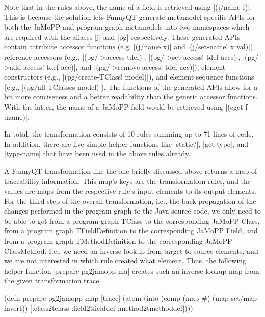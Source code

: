 \documentclass[submission]{eptcs}
\newcommand{\code}{\clojureinline}
\begin{document}
Note that in the rules above, the name of a field is retrieved using
\code|(j/name f)|.  This is because the solution lets FunnyQT generate
metamodel-specific APIs for both the JaMoPP and program graph metamodels into
two namespaces which are required with the aliases \code|j| and \code|pg|
respectively.  These generated APIs contain attribute accessor functions
(e.g. \code|(j/name x)| and \code|(j/set-name! x val)|), reference accessors
(e.g., \code|(pg/->access tdef)|, \code|(pg/->set-access! tdef accs)|,
\code|(pg/->add-access! tdef acc)|, and \code|(pg/->remove-access! tdef acc)|),
element constructors (e.g., \code|(pg/create-TClass! model)|), and element
sequence functions (e.g., \code|(pg/all-TClasses model)|).  The functions of
the generated APIs allow for a bit more conciseness and a better readability
than the generic accessor functions.  With the latter, the name of a JaMoPP
field would be retrieved using \code|(eget f :name)|.

In total, the transformation consists of 10 rules summing up to 71 lines of
code.  In addition, there are five simple helper functions like \code|static?|,
\code|get-type|, and \code|type-name| that have been used in the above rules
already.

\bigskip{}

A FunnyQT transformation like the one briefly discussed above returns a map of
traceability information.  This map's keys are the transformation rules, and
the values are maps from the respective rule's input elements to its output
elements.  For the third step of the overall transformation, i.e., the
back-propagation of the changes performed in the program graph to the Java
source code, we only need to be able to get from a program graph
\textsf{TClass} to the corresponding JaMoPP \textsf{Class}, from a program
graph \textsf{TFieldDefinition} to the corresponding JaMoPP \textsf{Field}, and
from a program graph \textsf{TMethodDefinition} to the corresponding JaMoPP
\textsf{ClassMethod}.  I.e., we need an inverse lookup from target to source
elements, and we are not interested in which rule created what element.  Thus,
the following helper function \code|prepare-pg2jamopp-ma| creates such an
inverse lookup map from the given transformation trace.

\begin{clojurecode}
(defn prepare-pg2jamopp-map [trace]
  (atom (into {} (comp (map #(%
                       (map set/map-invert))
              [:class2tclass :field2tfielddef :method2tmethoddef])))
\end{clojurecode}
\end{document}
